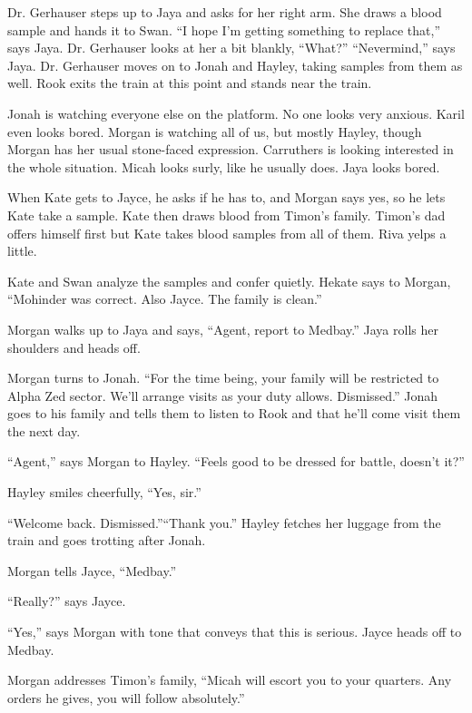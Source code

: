 Dr. Gerhauser steps up to Jaya and asks for her right arm.  She draws a blood sample and hands it to Swan.  ``I hope I'm getting something to replace that,'' says Jaya.  Dr. Gerhauser looks at her a bit blankly, ``What?''  ``Nevermind,'' says Jaya.  Dr. Gerhauser moves on to Jonah and Hayley, taking samples from them as well.  Rook exits the train at this point and stands near the train.  



Jonah is watching everyone else on the platform.  No one looks very anxious.  Karil even looks bored.  Morgan is watching all of us, but mostly Hayley, though Morgan has her usual stone-faced expression.  Carruthers is looking interested in the whole situation.  Micah looks surly, like he usually does.  Jaya looks bored.  



When Kate gets to Jayce, he asks if he has to, and Morgan says yes, so he lets Kate take a sample.  Kate then draws blood from Timon's family.  Timon's dad offers himself first but Kate takes blood samples from all of them.  Riva yelps a little.



Kate and Swan analyze the samples and confer quietly.  Hekate says to Morgan, ``Mohinder was correct. Also Jayce. The family is clean.''  



Morgan walks up to Jaya and says, ``Agent, report to Medbay.''  Jaya rolls her shoulders and heads off.

Morgan turns to Jonah. ``For the time being, your family will be restricted to Alpha Zed sector.  We'll arrange visits as your duty allows.  Dismissed.''  Jonah goes to his family and tells them to listen to Rook and that he'll come visit them the next day.

``Agent,'' says Morgan to Hayley. ``Feels good to be dressed for battle, doesn't it?''

Hayley smiles cheerfully, ``Yes, sir.''

``Welcome back.  Dismissed.''``Thank you.''  Hayley fetches her luggage from the train and goes trotting after Jonah.

Morgan tells Jayce, ``Medbay.''

``Really?'' says Jayce.

``Yes,'' says Morgan with tone that conveys that this is serious.  Jayce heads off to Medbay.

Morgan addresses Timon's family, ``Micah will escort you to your quarters.  Any orders he gives, you will follow absolutely.''

